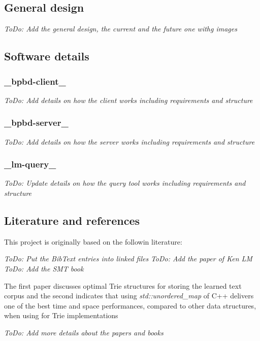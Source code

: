 \subsection*{General design}

{\itshape To\+Do\+: Add the general design, the current and the future one withg images}

\subsection*{Software details}

\subsubsection*{\+\_\+bpbd-\/client\+\_\+}

{\itshape To\+Do\+: Add details on how the client works including requirements and structure} \subsubsection*{\+\_\+bpbd-\/server\+\_\+}

{\itshape To\+Do\+: Add details on how the server works including requirements and structure} \subsubsection*{\+\_\+lm-\/query\+\_\+}

{\itshape To\+Do\+: Update details on how the query tool works including requirements and structure}

\subsection*{Literature and references}

This project is originally based on the followin literature\+:

{\itshape To\+Do\+: Put the Bib\+Text entries into linked files} {\itshape To\+Do\+: Add the paper of Ken L\+M} {\itshape To\+Do\+: Add the S\+M\+T book}

The first paper discusses optimal Trie structures for storing the learned text corpus and the second indicates that using {\itshape std\+::unordered\+\_\+map} of C++ delivers one of the best time and space performances, compared to other data structures, when using for Trie implementations

{\itshape To\+Do\+: Add more details about the papers and books}

